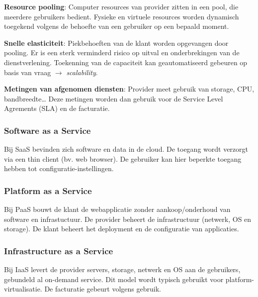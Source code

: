 \documentclass[a4paper,12pt]{article}
\begin{document}
\textbf{Resource pooling}: Computer resources van provider zitten in een pool, die meerdere gebruikers bedient.
Fysieke en virtuele resources worden dynamisch toegekend volgens de behoefte van een gebruiker op een bepaald moment.

\textbf{Snelle elasticiteit}: Piekbehoeften van de klant worden opgevangen door pooling.
Er is een sterk verminderd risico op uitval en onderbrekingen van de dienstverlening.
Toekenning van de capaciteit kan geautomatiseerd gebeuren op basis van vraag $\rightarrow$ \textit{scalability}.

\textbf{Metingen van afgenomen diensten}: Provider meet gebruik van storage, CPU, bandbreedte\dots
Deze metingen worden dan gebruik voor de Service Level Agrements (SLA) en de facturatie.

\subsubsection{Software as a Service}
Bij SaaS bevinden zich software en data in de cloud.
De toegang wordt verzorgt via een thin client (bv. web browser).
De gebruiker kan hier beperkte toegang hebben tot configuratie-instellingen.

\subsubsection{Platform as a Service}
Bij PaaS bouwt de klant de webapplicatie zonder aankoop/onderhoud van software en infrastuctuur.
De provider beheert de infrastructuur (netwerk, OS en storage).
De klant beheert het deployment en de configuratie van applicaties.

\subsubsection{Infrastructure as a Service}
Bij IaaS levert de provider servers, storage, netwerk en OS aan de gebruikers, gebundeld al on-demand service.
Dit model wordt typisch gebruikt voor platform-virtualisatie.
De facturatie gebeurt volgens gebruik.
\end{document}
